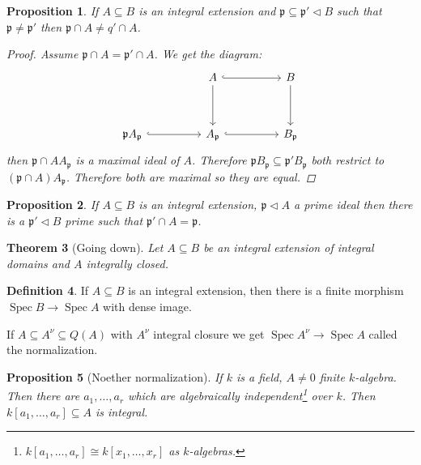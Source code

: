 \documentclass{article}
\DeclareMathOperator{\Spec}{Spec}
\newcommand{\primeid}{\mathfrak{p}}
\newcommand{\ideal}{\triangleleft}
\newtheorem{theorem}{Theorem}[section]
\newtheorem{proposition}[theorem]{Proposition}
\theoremstyle{definition}
\newtheorem{definition}[theorem]{Definition}
\begin{document}
\begin{proposition}
    If \(A\subseteq B\) is an integral extension and
    \(\primeid\subseteq\primeid'\ideal B\) such that \(\primeid\neq\primeid'\)
    then \(\primeid\cap A\neq q'\cap A\).

    \begin{proof}
        Assume \(\primeid\cap A=\primeid'\cap A\). We get the diagram:
        \[
            \begin{tikzcd}[ampersand replacement=\&]
                \&\& A \&\& B \\
                \\
                {\primeid A_{\primeid}}\&\& {A_{\primeid}} \&\& {B_{\primeid}}
                \arrow[hook, from=1-3, to=1-5]
                \arrow[from=1-3, to=3-3]
                \arrow[from=1-5, to=3-5]
                \arrow[hook, from=3-3, to=3-5]
                \arrow[hook, from=3-1, to=3-3]
            \end{tikzcd}
        \]
        then \(\primeid\cap A A_{\primeid}\) is a maximal ideal of \(A\).
        Therefore \(\primeid B_{\primeid}\subseteq\primeid' B_{\primeid}\) both
        restrict to \((\primeid\cap A) A_{\primeid}\). Therefore both are maximal
        so they are equal.
    \end{proof}
\end{proposition}

\begin{proposition}
    If \(A\subseteq B\) is an integral extension, \(\primeid\ideal A\) a prime
    ideal then there is a \(\primeid'\ideal B\) prime such that \(\primeid'\cap
    A=\primeid\).
\end{proposition}

\begin{theorem}[Going down]
    Let \(A\subseteq B\) be an integral extension of integral domains and \(A\)
    integrally closed.
\end{theorem}

\begin{definition}
    If \(A\subseteq B\) is an integral extension, then there is a finite
    morphism \(\Spec B\to\Spec A\) with dense image.

    If \(A\subseteq A^{\nu}\subseteq Q(A)\) with \(A^{\nu}\) integral closure
    we get \(\Spec A^{\nu}\to\Spec A\) called the normalization.
\end{definition}

\begin{proposition}[Noether normalization]
    If \(k\) is a field, \(A\neq 0\) finite \(k\)-algebra. Then there are
    \(a_{1},\ldots,a_{r}\) which are algebraically
    independent\footnote{\(k[a_{1},\ldots,a_{r}]\cong k[x_{1},\ldots,x_{r}]\) as
    \(k\)-algebras.} over \(k\). Then \(k[a_{1},\ldots,a_{r}]\subseteq A\) is
    integral.
\end{proposition}
\end{document}

